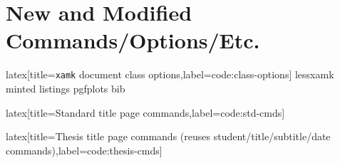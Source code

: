 \section{New and Modified Commands/Options/Etc.}

\begin{code}{latex}[title={\texttt{xamk} document class options},label=code:class-options]
lessxamk
minted
listings
pgfplots
bib
\end{code}
%
\begin{code}[firstnumber=last]{latex}[title={Standard title page commands},label=code:std-cmds]
\maketitle
\end{code}
%
\begin{code}[firstnumber=last]{latex}[title={Thesis title page commands (reuses student/title/subtitle/date commands)},label=code:thesis-cmds]
\maketitle[thesis]
\end{code}
